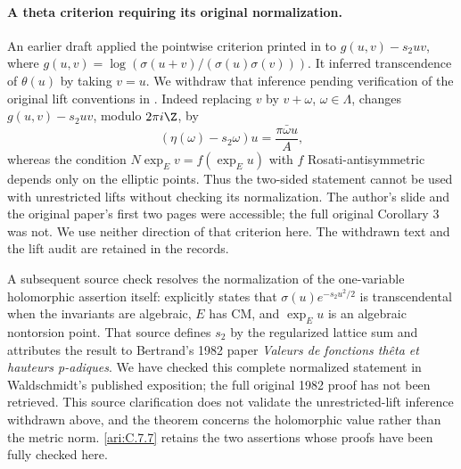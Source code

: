 \paragraph{A theta criterion requiring its original normalization.}
An earlier draft applied the pointwise criterion printed in
\citet[final slide, comment (c)]{bertrand2017} to
$g(u,v)-s_2uv$, where
$g(u,v)=\log(\sigma(u+v)/(\sigma(u)\sigma(v)))$.
It inferred transcendence of $\theta(u)$ by taking $v=u$.
We withdraw that inference pending verification of the original
lift conventions in \citet[Corollary 3]{bertrand1984}.
Indeed replacing $v$ by $v+\omega$, $\omega\in\Lambda$,
changes $g(u,v)-s_2uv$, modulo $2\pi i\Z$, by
\[
 (\eta(\omega)-s_2\omega)u=\frac{\pi\bar\omega u}{A},
\]
whereas the condition $N\exp_Ev=f(\exp_Eu)$ with $f$
Rosati-antisymmetric depends only on the elliptic points.
Thus the two-sided statement cannot be used with unrestricted
lifts without checking its normalization. The author's slide
and the original paper's first two pages were accessible;
the full original Corollary 3 was not. We use neither direction
of that criterion here. The withdrawn text and the lift audit
are retained in the records.

A subsequent source check resolves the normalization of the
one-variable holomorphic assertion itself:
\citet[p.~15-03]{waldschmidt1988theta} explicitly states that
$\sigma(u)e^{-s_2u^2/2}$ is transcendental when the invariants
are algebraic, $E$ has CM, and $\exp_Eu$ is an algebraic
nontorsion point.  That source defines $s_2$ by the regularized
lattice sum and attributes the result to Bertrand's 1982
paper \emph{Valeurs de fonctions th\^eta et hauteurs p-adiques}.
We have checked this complete normalized statement in
Waldschmidt's published exposition; the full original 1982
proof has not been retrieved.  This source clarification
does not validate the unrestricted-lift inference withdrawn
above, and the theorem concerns the holomorphic value rather
than the metric norm.  \ref{ari:C.7.7} retains the two assertions whose
proofs have been fully checked here.

